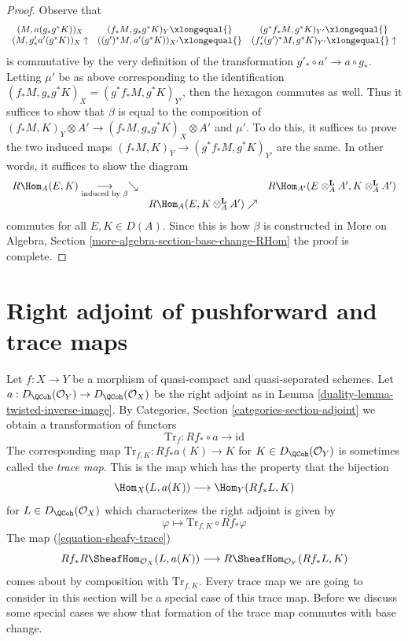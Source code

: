\begin{proof}
\medskip\noindent
Observe that
$$
\begin{array}{ccc}(M, a(g_*g^*K))_X & (f_*M, g_* g^*K)_Y \xlongequal{} & (g^*f_*M, g^*K)_{Y'} \xlongequal{} \\ (M, g'_* a'(g^*K))_X \uparrow & ((g')^*M, a'(g^*K))_{X'} \xlongequal{} & (f'_*(g')^*M, g^*K)_{Y'} \xlongequal{}\uparrow\end{array}
$$
is commutative by the very definition of the transformation
$g'_* \circ a' \to a \circ g_*$. Letting $\mu'$ be as above
corresponding to the identification
$(f_*M, g_*g^*K)_X = (g^*f_*M, g^*K)_{Y'}$, then the
hexagon commutes as well. Thus it suffices to show that
$\beta$ is equal to the composition of
$(f_*M, K)_Y \otimes A' \to (f_*M, g_*g^*K)_X \otimes A'$
and $\mu'$. To do this, it suffices to prove the two induced maps
$(f_*M, K)_Y \to (g^*f_*M, g^*K)_{Y'}$ are the same.
In other words, it suffices to show the diagram
$$
\begin{array}{ccc}R\Hom_A(E, K) \underset{\text{induced by }\beta}{\longrightarrow}\searrow &  & R\Hom_{A'}(E \otimes_A^\mathbf{L} A', K \otimes_A^\mathbf{L} A') \\  & R\Hom_A(E, K \otimes_A^\mathbf{L} A') \nearrow & \end{array}
$$
commutes for all $E, K \in D(A)$. Since this is how $\beta$ is constructed in
More on Algebra, Section \ref{more-algebra-section-base-change-RHom}
the proof is complete.
\end{proof}

\section{Right adjoint of pushforward and trace maps}
\label{duality-section-trace}
Let $f : X \to Y$ be a morphism of quasi-compact and quasi-separated
schemes. Let $a : D_\QCoh(\mathcal{O}_Y) \to D_\QCoh(\mathcal{O}_X)$
be the right adjoint as in Lemma \ref{duality-lemma-twisted-inverse-image}. By
Categories, Section \ref{categories-section-adjoint} we obtain a
transformation of functors
$$
\text{Tr}_f : Rf_* \circ a \longrightarrow \text{id}
$$
The corresponding map $\text{Tr}_{f, K} : Rf_*a(K) \longrightarrow K$
for $K \in D_\QCoh(\mathcal{O}_Y)$ is sometimes called the {\it trace map}.
This is the map which has the property that the bijection
$$
\Hom_X(L, a(K)) \longrightarrow \Hom_Y(Rf_*L, K)
$$
for $L \in D_\QCoh(\mathcal{O}_X)$ which characterizes the right adjoint
is given by
$$
\varphi \longmapsto \text{Tr}_{f, K} \circ Rf_*\varphi
$$
The map (\ref{equation-sheafy-trace})
$$
Rf_*R\SheafHom_{\mathcal{O}_X}(L, a(K))
\longrightarrow
R\SheafHom_{\mathcal{O}_Y}(Rf_*L, K)
$$
comes about by composition with $\text{Tr}_{f, K}$.
Every trace map we are going to consider in this section will be a
special case of this trace map. Before we discuss some special cases
we show that formation of the trace map commutes with base change.

